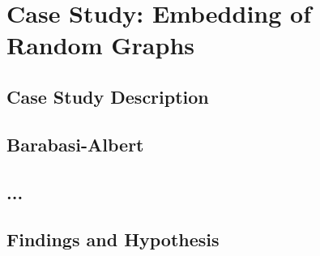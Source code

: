 \chapter{Case Study: Embedding of Random Graphs}\label{chap:2}

\section{Case Study Description}

\section{Barabasi-Albert}
\section{...}



\section{Findings and Hypothesis}
